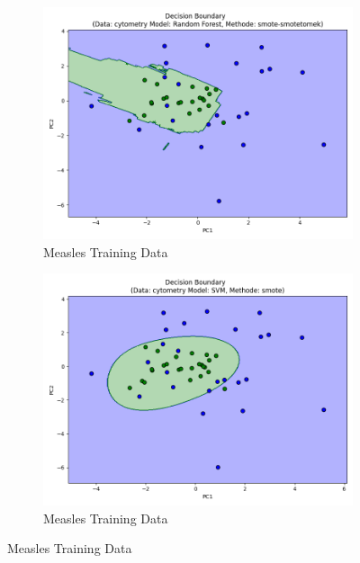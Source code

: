 \documentclass[12pt,a4paper]{report}
\begin{document}
\begin{figure}[h!] 
    \centering 

    \begin{subfigure}[b]{0.49\textwidth}
        \centering
        \includegraphics[width=\textwidth]{images/train_decision_boundary_M.png} 
        \caption{Measles Training Data} 
        \label{fig:train_decision_boundary_M}
    \end{subfigure}
    \hfill
    \begin{subfigure}[b]{0.49\textwidth}
        \centering
        \includegraphics[width=\linewidth]{images/train2_decision_boundary_M.png}
        \caption{Measles Training Data} 
        \label{fig:train2_decision_boundary_M} 
    \end{subfigure}


\end{figure}
\end{document}
